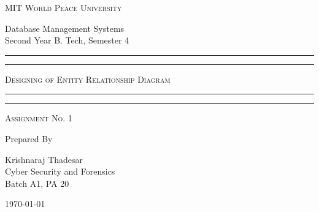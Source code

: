 \documentclass[11pt]{article}
\begin{document}
\begin{titlepage}
	\centering


	\huge\textsc{
		MIT World Peace University
	}\\

	\vspace{0.75\baselineskip} %

	\LARGE{
		Database Management Systems\\
		Second Year B. Tech, Semester 4
	}

	\vfill %


	\rule{\textwidth}{1.6pt}\vspace*{-\baselineskip}\vspace*{2pt}
	\rule{\textwidth}{0.6pt}
	\vspace{0.75\baselineskip} %



	\huge{\textsc{
			Designing of Entity Relationship Diagram
		}} \\



	\vspace{0.5\baselineskip} %
	\rule{\textwidth}{0.6pt}\vspace*{-\baselineskip}\vspace*{2.8pt}
	\rule{\textwidth}{1.6pt}

	\vspace{1\baselineskip} %


	\LARGE\textsc{
		Assignment No. 1
	} %
	\vfill


	Prepared By
	\vspace{0.5\baselineskip} %

	\Large{
		Krishnaraj Thadesar \\
		Cyber Security and Forensics\\
		Batch A1, PA 20
	}


	\vspace{0.5\baselineskip} %
	\today

\end{titlepage}
\end{document}
